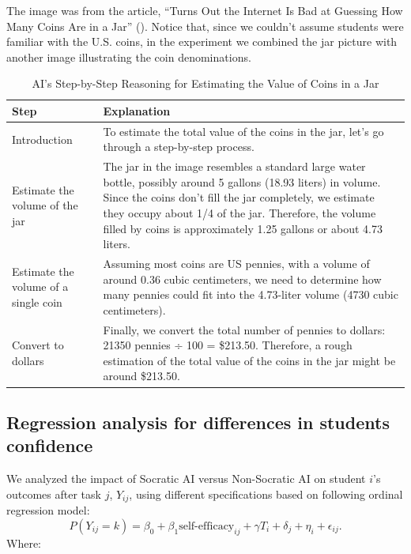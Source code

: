 \documentclass[
  11pt,
]{article}
\begin{document}
The image was from the article, ``Turns Out the Internet Is Bad at Guessing How Many Coins Are in a Jar'' (). Notice that, since we couldn't assume students were familiar with the U.S. coins, in the experiment we combined the jar picture with another image illustrating the coin denominations.

\begin{table}

\caption{\label{tab:explanation}AI's Step-by-Step Reasoning for Estimating the Value of Coins in a Jar}
\centering
\begin{tabular}[t]{l>{\raggedright\arraybackslash}p{4in}}
\toprule
Step & Explanation\\
\midrule
Introduction & To estimate the total value of the coins in the jar, let's go through a step-by-step process.\\
Estimate the volume of the jar & The jar in the image resembles a standard large water bottle, possibly around 5 gallons (18.93 liters) in volume. Since the coins don't fill the jar completely, we estimate they occupy about 1/4 of the jar. Therefore, the volume filled by coins is approximately 1.25 gallons or about 4.73 liters.\\
Estimate the volume of a single coin & Assuming most coins are US pennies, with a volume of around 0.36 cubic centimeters, we need to determine how many pennies could fit into the 4.73-liter volume (4730 cubic centimeters).\\
Convert to dollars & Finally, we convert the total number of pennies to dollars: 21350 pennies ÷ 100 = \$213.50. Therefore, a rough estimation of the total value of the coins in the jar might be around \$213.50.\\
\bottomrule
\end{tabular}
\end{table}
\newpage

\subsection{Regression analysis for differences in students confidence}\label{sec:regress-confidence}

We analyzed the impact of Socratic AI versus Non-Socratic AI on student \(i\)'s outcomes after task \(j\), \(Y_{ij}\), using different specifications based on following ordinal regression model:
\[
  P(Y_{ij} = k) = 
    \beta_0 + \beta_1 \text{self-efficacy}_{ij} + \gamma T_{i} 
    + \delta_j + \eta_i + \epsilon_{ij}.
\]
Where:
\end{document}
